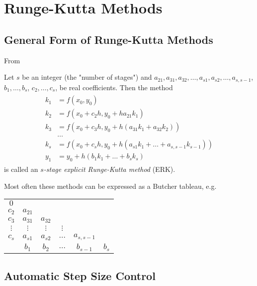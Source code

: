	\section{Runge-Kutta Methods}
	\subsection{General Form of Runge-Kutta Methods}
	
	From \cite[134]{Hairer2008}
	
	\begin{definition}
		Let \(s\) be an integer (the "number of stages") and \(a_{21}, a_{31}, a_{32}, \dots, a_{s1}, a_{s2},\dots,a_{s,s-1}\), \(b_1, \dots, b_s\), \(c_2, \dots,c_s\), be real coefficients. Then the method
		\begin{align}
			\begin{split}
			k_1 &= f(x_0, y_0)\\
			k_2 &= f(x_0 + c_2h , y_0 + ha_{21}k_1)\\
			k_3 &= f(x_0 + c_3h, y_0 + h(a_{31}k_1 + a_{32}k_2))\\
			\: &\dots \\
			k_s &= f(x_0 + c_s h, y_0 + h(a_{s1}k_1 + \dots + a_{s,s-1}k_{s-1}))\\
			y_1 &= y_0 + h(b_1k_1 + \dots + b_sk_s)
			\end{split}
		\end{align}
		is called an \textit{\(s\)-stage explicit Runge-Kutta method} (ERK).
	\end{definition}
	\vspace{1cm}
	\noindent Most often these methods can be expressed as a Butcher tableau, e.g.
	\begin{table}[H]
		\centering
		\begin{tabular}{c|ccccc}
			  \(0\)    &            &            &            &               &         \\
			 \(c_2\)   & \(a_{21}\) &            &            &               &         \\
			 \(c_3\)   & \(a_{31}\) & \(a_{32}\) &            &               &         \\
			\(\vdots\) & \(\vdots\) & \(\vdots\) & \(\vdots\) &               &         \\
			 \(c_s\)   & \(a_{s1}\) & \(a_{s2}\) & \(\dots\)  & \(a_{s,s-1}\) &         \\ \hline
			           &  \(b_1\)   &  \(b_2\)   & \(\dots\)  &  \(b_{s-1}\)  & \(b_s\)
		\end{tabular}
	\end{table}
	
	\subsection{Automatic Step Size Control}
	
	
	
	\printbibliography

